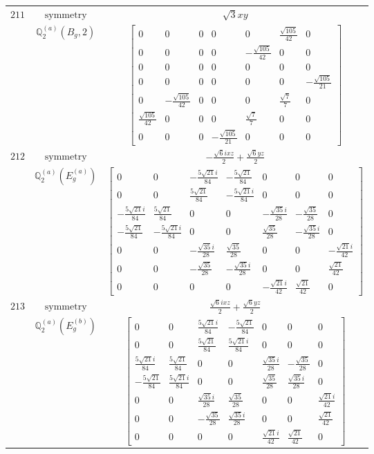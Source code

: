 \documentclass[fleqn,8pt,landscape]{jsarticle}
\begin{document}
\begin{longtable}{ccc}
$ 211 $ & $ \text{symmetry} $ & $ \sqrt{3} x y $ \\
$  $ & $ \mathbb{Q}_{2}^{(a)}(B_{g},2) $ & $ \begin{bmatrix} 0 & 0 & 0 & 0 & 0 & \frac{\sqrt{105}}{42} & 0 \\ 0 & 0 & 0 & 0 & - \frac{\sqrt{105}}{42} & 0 & 0 \\ 0 & 0 & 0 & 0 & 0 & 0 & 0 \\ 0 & 0 & 0 & 0 & 0 & 0 & - \frac{\sqrt{105}}{21} \\ 0 & - \frac{\sqrt{105}}{42} & 0 & 0 & 0 & \frac{\sqrt{7}}{7} & 0 \\ \frac{\sqrt{105}}{42} & 0 & 0 & 0 & \frac{\sqrt{7}}{7} & 0 & 0 \\ 0 & 0 & 0 & - \frac{\sqrt{105}}{21} & 0 & 0 & 0 \end{bmatrix} $ \\ \hline
$ 212 $ & $ \text{symmetry} $ & $ - \frac{\sqrt{6} i x z}{2} + \frac{\sqrt{6} y z}{2} $ \\
$  $ & $ \mathbb{Q}_{2}^{(a)}(E_{g}^{(a)}) $ & $ \begin{bmatrix} 0 & 0 & - \frac{5 \sqrt{21} i}{84} & - \frac{5 \sqrt{21}}{84} & 0 & 0 & 0 \\ 0 & 0 & \frac{5 \sqrt{21}}{84} & - \frac{5 \sqrt{21} i}{84} & 0 & 0 & 0 \\ - \frac{5 \sqrt{21} i}{84} & \frac{5 \sqrt{21}}{84} & 0 & 0 & - \frac{\sqrt{35} i}{28} & - \frac{\sqrt{35}}{28} & 0 \\ - \frac{5 \sqrt{21}}{84} & - \frac{5 \sqrt{21} i}{84} & 0 & 0 & \frac{\sqrt{35}}{28} & - \frac{\sqrt{35} i}{28} & 0 \\ 0 & 0 & - \frac{\sqrt{35} i}{28} & \frac{\sqrt{35}}{28} & 0 & 0 & - \frac{\sqrt{21} i}{42} \\ 0 & 0 & - \frac{\sqrt{35}}{28} & - \frac{\sqrt{35} i}{28} & 0 & 0 & \frac{\sqrt{21}}{42} \\ 0 & 0 & 0 & 0 & - \frac{\sqrt{21} i}{42} & \frac{\sqrt{21}}{42} & 0 \end{bmatrix} $ \\ \hline
$ 213 $ & $ \text{symmetry} $ & $ \frac{\sqrt{6} i x z}{2} + \frac{\sqrt{6} y z}{2} $ \\
$  $ & $ \mathbb{Q}_{2}^{(a)}(E_{g}^{(b)}) $ & $ \begin{bmatrix} 0 & 0 & \frac{5 \sqrt{21} i}{84} & - \frac{5 \sqrt{21}}{84} & 0 & 0 & 0 \\ 0 & 0 & \frac{5 \sqrt{21}}{84} & \frac{5 \sqrt{21} i}{84} & 0 & 0 & 0 \\ \frac{5 \sqrt{21} i}{84} & \frac{5 \sqrt{21}}{84} & 0 & 0 & \frac{\sqrt{35} i}{28} & - \frac{\sqrt{35}}{28} & 0 \\ - \frac{5 \sqrt{21}}{84} & \frac{5 \sqrt{21} i}{84} & 0 & 0 & \frac{\sqrt{35}}{28} & \frac{\sqrt{35} i}{28} & 0 \\ 0 & 0 & \frac{\sqrt{35} i}{28} & \frac{\sqrt{35}}{28} & 0 & 0 & \frac{\sqrt{21} i}{42} \\ 0 & 0 & - \frac{\sqrt{35}}{28} & \frac{\sqrt{35} i}{28} & 0 & 0 & \frac{\sqrt{21}}{42} \\ 0 & 0 & 0 & 0 & \frac{\sqrt{21} i}{42} & \frac{\sqrt{21}}{42} & 0 \end{bmatrix} $ \\ \hline

\end{longtable}
\end{document}
